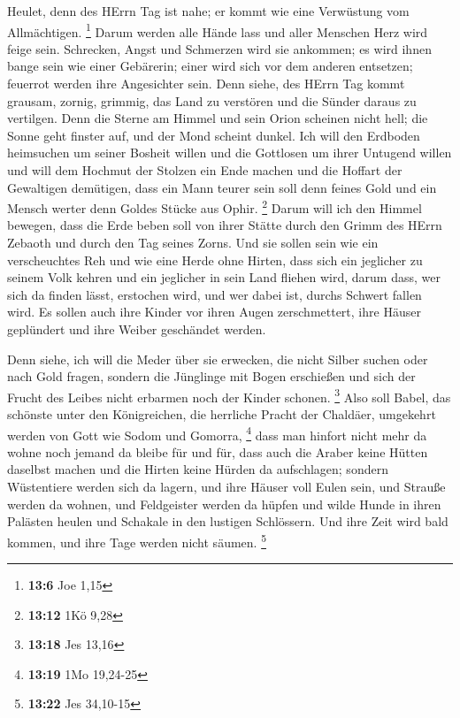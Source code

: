  Heulet, denn des HErrn Tag ist nahe; er kommt wie eine
Verwüstung vom Allmächtigen. \footnote{\textbf{13:6} Joe 1,15}
 Darum werden alle Hände lass und aller Menschen Herz wird
feige sein.  Schrecken, Angst und Schmerzen wird sie
ankommen; es wird ihnen bange sein wie einer Gebärerin; einer wird sich
vor dem anderen entsetzen; feuerrot werden ihre Angesichter sein.
 Denn siehe, des HErrn Tag kommt grausam, zornig, grimmig,
das Land zu verstören und die Sünder daraus zu vertilgen. 
Denn die Sterne am Himmel und sein Orion scheinen nicht hell; die Sonne
geht finster auf, und der Mond scheint dunkel.  Ich will
den Erdboden heimsuchen um seiner Bosheit willen und die Gottlosen um
ihrer Untugend willen und will dem Hochmut der Stolzen ein Ende machen
und die Hoffart der Gewaltigen demütigen,  dass ein Mann
teurer sein soll denn feines Gold und ein Mensch werter denn Goldes
Stücke aus Ophir. \footnote{\textbf{13:12} 1Kö 9,28}  Darum
will ich den Himmel bewegen, dass die Erde beben soll von ihrer Stätte
durch den Grimm des HErrn Zebaoth und durch den Tag seines Zorns.
 Und sie sollen sein wie ein verscheuchtes Reh und wie eine
Herde ohne Hirten, dass sich ein jeglicher zu seinem Volk kehren und ein
jeglicher in sein Land fliehen wird,  darum dass, wer sich
da finden lässt, erstochen wird, und wer dabei ist, durchs Schwert
fallen wird.  Es sollen auch ihre Kinder vor ihren Augen
zerschmettert, ihre Häuser geplündert und ihre Weiber geschändet werden.

 Denn siehe, ich will die Meder über sie erwecken, die
nicht Silber suchen oder nach Gold fragen,  sondern die
Jünglinge mit Bogen erschießen und sich der Frucht des Leibes nicht
erbarmen noch der Kinder schonen. \footnote{\textbf{13:18} Jes 13,16}
 Also soll Babel, das schönste unter den Königreichen, die
herrliche Pracht der Chaldäer, umgekehrt werden von Gott wie Sodom und
Gomorra, \footnote{\textbf{13:19} 1Mo 19,24-25}  dass man
hinfort nicht mehr da wohne noch jemand da bleibe für und für, dass auch
die Araber keine Hütten daselbst machen und die Hirten keine Hürden da
aufschlagen;  sondern Wüstentiere werden sich da lagern,
und ihre Häuser voll Eulen sein, und Strauße werden da wohnen, und
Feldgeister werden da hüpfen  und wilde Hunde in ihren
Palästen heulen und Schakale in den lustigen Schlössern. Und ihre Zeit
wird bald kommen, und ihre Tage werden nicht säumen. \footnote{\textbf{13:22}
  Jes 34,10-15}

